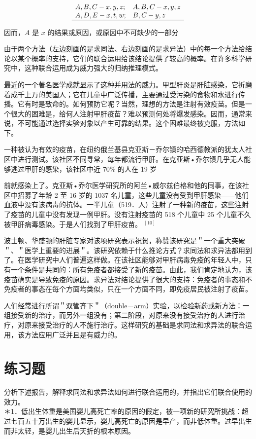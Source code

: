 $$
\begin{array}{ll}
A, B, C-x, y, z ; & A, B, C-x, y, z \\
A, D, E-x, t, w ; & B, C-y, z \\
\hline
\end{array}
$$

因而，$A$ 是 $x$ 的结果或原因，或原因中不可缺少的一部分

由于两个方法（左边刻画的是求同法、右边刻画的是求异法）中的每一个方法给结论以某个概率的支持，它们的联合运用给该结论提供了较高的概率。在许多科学研究中，这种联合运用成为威力强大的归纳推理模式。

最近的一个著名医学成就显示了这种并用法的威力。甲型肝炎是肝脏感染，它折磨着成千上万的美国人；它在儿童中广泛传播，主要通过受污染的食物和水进行传播。它有时是致命的。如何预防它呢？当然，理想的方法是注射有效疫苗。但是一个很大的困难是，给何人注射甲肝疫苗？难以预测何处将爆发感染。因而，通常来说，不可能通过选择实验对象以产生可靠的结果。这个困难最终被克服，方法如下。

一种被认为有效的疫苗，在纽约俄兰基县克亚斯－乔尔镇的哈西德教派的犹太人社区中进行测试。该社区不同寻常，每年都流行甲肝。在克亚斯•乔尔镇几乎无人能够逃过甲肝的感染，该社区中近 $70 \%$ 的人在 19 岁

前就感染上了。克亚斯•乔尔医学研究所的阿兰•威尔兹伯格和他的同事，在该社区中招募了年龄 2 至 16 岁的 1037 名儿童，这些儿童没有受到甲肝感染——他们血液中没有该病毒的抗体。一半儿童（519．人）注射了一种新的疫苗，这些注射了疫苗的儿童中没有发现一例甲肝。没有注射疫苗的 518 个儿童中 25 个儿童不久被甲肝病毒感染。于是人们找到了甲肝疫苗。 ${ }^{[10]}$

波士顿、华盛顿的肝脏专家对该项研究表示祝贺，称赞该研究是＂一个重大突破＂、＂医学上重要的进展＂。该研究依赖于什么推论方式？求同法和求异法都用到了。在医学研究中人们普遍这样做。在该社区能够对甲肝病毒免疫的年轻人中，只有一个条件是共同的：所有免疫者都接受了新的疫苗。由此，我们肯定地认为，该疫苗确实是导致免疫的原因。求异法对结论提供了很大的支持：免疫者的事态和不免疫者的事态在每个方面均类似，只在一个方面不同，即免疫居民被注射了疫苗。

人们经常进行所谓＂双管齐下＂（double－arm）实验，以检验新药或新方法：一组接受新的治疗，而另外一组没有；第二阶段，对原来没有接受治疗的人进行治疗，对原来接受治疗的人不施行治疗。这样研究的基础是求同法和求异法的联合运用，该方法应用广泛并且是有威力的。

\section*{练习题}
分析下述报告，解释求同法和求异法如何进行联合运用的，并指出它们联合使用的效力。\\
＊1．低出生体重是美国婴儿高死亡率的原因的假定，被一项新的研究所挑战：超过七百五十万出生的婴儿显示，婴儿高死亡的原因是早产，而非低体重。过早出生而非太轻，是婴儿出生后天折的根本原因。


